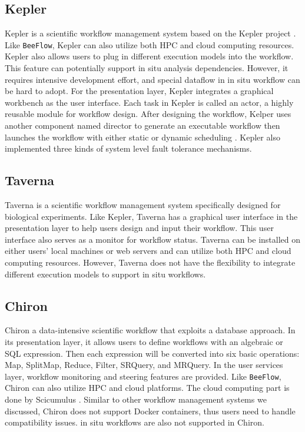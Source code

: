 \subsection{Kepler}
Kepler is a scientific workflow management system based on the Kepler project \cite{altintas2004kepler, altintas2004kepler2}. Like \texttt{BeeFlow}, Kepler can also utilize both HPC and cloud computing resources. Kepler also allows users to plug in different execution models into the workflow. This feature can potentially support in situ analysis dependencies. However, it requires intensive development effort, and special dataflow in in situ workflow can be hard to adopt. For the presentation layer, Kepler integrates a graphical workbench as the user interface. Each task in Kepler is called an actor, a highly reusable module for workflow design. After designing the workflow, Kelper uses another component named director to generate an executable workflow then launches the workflow with either static or dynamic scheduling \cite{bux2013parallelization, ludascher2006scientific}. Kepler also implemented three kinds of system level fault tolerance mechanisms.

\subsection{Taverna}
Taverna \cite{missier2010taverna} is a scientific workflow management system specifically designed for biological experiments. Like Kepler, Taverna has a graphical user interface in the presentation layer to help users design and input their workflow. This user interface also serves as a monitor for workflow status. Taverna can be installed on either users' local machines or web servers and can utilize both HPC and cloud computing resources. However, Taverna does not have the flexibility to integrate different execution models to support in situ workflows.

\subsection{Chiron}
Chiron \cite{ozsu2011principles} a data-intensive scientific workflow that exploits a database approach. In its presentation layer, it allows users to define workflows with an algebraic or SQL expression. Then each expression will be converted into six basic operations: Map, SplitMap, Reduce, Filter, SRQuery, and MRQuery. In the user services layer, workflow monitoring and steering features are provided. Like \texttt{BeeFlow}, Chiron can also utilize HPC and cloud platforms. The cloud computing part is done by Scicumulus \cite{de2010scicumulus, oliveira2012adaptive}. Similar to other workflow management systems we discussed, Chiron does not support Docker containers, thus users need to handle compatibility issues. in situ workflows are also not supported in Chiron.

